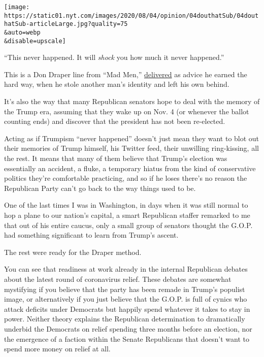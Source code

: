 \texttt{[image: https://static01.nyt.com/images/2020/08/04/opinion/04douthatSub/04douthatSub-articleLarge.jpg?quality=75\\\&auto=webp\\\&disable=upscale]}

``This never happened. It will \emph{shock} you how much it never
happened.''

This is a Don Draper line from ``Mad Men,''
\href{https://www.youtube.com/watch?v=kEMe3wj-QuM}{delivered} as advice
he earned the hard way, when he stole another man's identity and left
his own behind.

It's also the way that many Republican senators hope to deal with the
memory of the Trump era, assuming that they wake up on Nov. 4 (or
whenever the ballot counting ends) and discover that the president has
not been re-elected.

Acting as if Trumpism ``never happened'' doesn't just mean they want to
blot out their memories of Trump himself, his Twitter feed, their
unwilling ring-kissing, all the rest. It means that many of them believe
that Trump's election was essentially an accident, a fluke, a temporary
hiatus from the kind of conservative politics they're comfortable
practicing, and so if he loses there's no reason the Republican Party
can't go back to the way things used to be.

One of the last times I was in Washington, in days when it was still
normal to hop a plane to our nation's capital, a smart Republican
staffer remarked to me that out of his entire caucus, only a small group
of senators thought the G.O.P. had something significant to learn from
Trump's ascent.

The rest were ready for the Draper method.

You can see that readiness at work already in the internal Republican
debates about the latest round of coronavirus relief. These debates are
somewhat mystifying if you believe that the party has been remade in
Trump's populist image, or alternatively if you just believe that the
G.O.P. is full of cynics who attack deficits under Democrats but happily
spend whatever it takes to stay in power. Neither theory explains the
Republican determination to dramatically underbid the Democrats on
relief spending three months before an election, nor the emergence of a
faction within the Senate Republicans that doesn't want to spend more
money on relief at all.

